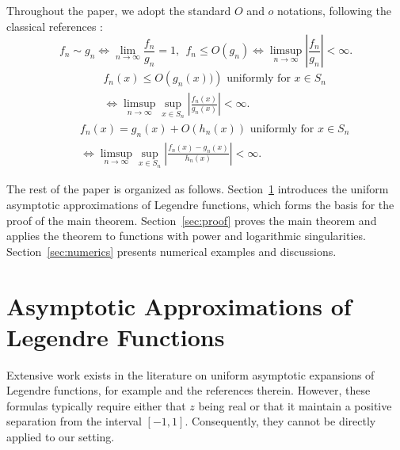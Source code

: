 \documentclass[11pt]{article}
\begin{document}
Throughout the paper, we adopt the standard $O$ and $o$ notations, following the classical references \cite{szeg1939orthogonal,olver1997asymptotics,olver2010nist}:
\begin{equation}
    f_n \sim g_n \Longleftrightarrow \lim_{n \to \infty}\frac{f_n}{g_n} = 1, \ \ f_n \leq  O\left(g_n\right)   \Longleftrightarrow \limsup_{n\to \infty} \left|\frac{f_n}{g_n}\right|  < \infty.
\end{equation}
\begin{eqnarray}
    &&f_n(x) \leq  O\left(g_n(x))\right) \text{ uniformly for } x \in S_n  \nonumber\\ &&\Longleftrightarrow \limsup_{n\to \infty} \sup_{x \in S_n}\left|\frac{f_n(x)}{g_n(x)}\right|  < \infty.
\end{eqnarray}
\begin{eqnarray}
    &&f_n(x) = g_n(x) + O(h_n(x)) \text{ uniformly for } x \in S_n  \nonumber\\ &&\Longleftrightarrow \limsup_{n\to \infty} \sup_{x \in S_n}\left|\frac{f_n(x) -g_n(x)}{h_n(x)}\right|  < \infty.
\end{eqnarray}

The rest of the paper is organized as follows. Section~\ref{sec:asymptotic} introduces the uniform asymptotic approximations of Legendre functions, which forms the basis for the proof of the main theorem. Section~\ref{sec:proof} proves the main theorem and applies the theorem to functions with power and logarithmic singularities. Section~\ref{sec:numerics} presents numerical examples and discussions.

\section{Asymptotic Approximations of Legendre Functions}\label{sec:asymptotic}
Extensive work exists in the literature on uniform asymptotic expansions of Legendre functions, for example \cite{dunster2003uniform,szeg1939orthogonal,olver1997asymptotics,olver2010nist,bakaleinikov2020uniform,nemes2020large} and the references therein. However, these formulas typically require either that $z$ being real or that it maintain a positive separation from the interval $[-1,1]$. Consequently, they cannot be directly applied to our setting. 
\end{document}
